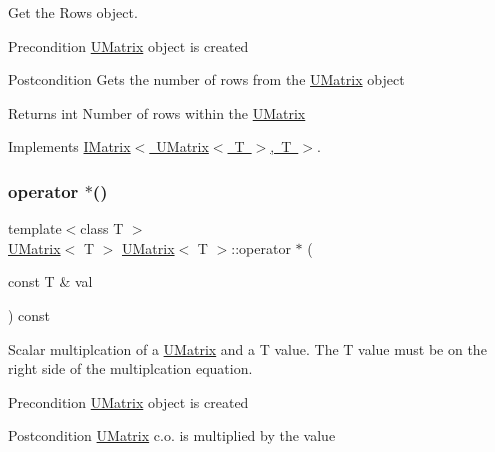 Get the Rows object. 

\begin{DoxyPrecond}{Precondition}
\mbox{\hyperlink{class_u_matrix}{U\+Matrix}} object is created 
\end{DoxyPrecond}
\begin{DoxyPostcond}{Postcondition}
Gets the number of rows from the \mbox{\hyperlink{class_u_matrix}{U\+Matrix}} object 
\end{DoxyPostcond}
\begin{DoxyReturn}{Returns}
int Number of rows within the \mbox{\hyperlink{class_u_matrix}{U\+Matrix}} 
\end{DoxyReturn}


Implements \mbox{\hyperlink{class_i_matrix_a58632b018f4023768db7963e22f468da}{I\+Matrix$<$ U\+Matrix$<$ T $>$, T $>$}}.

\mbox{\label{class_u_matrix_a7b1875cfc49b374875dac2a58948f3ac}} 
\subsubsection{\texorpdfstring{operator $\ast$()}{operator *()}}
{\footnotesize\ttfamily template$<$class T $>$ \\
\mbox{\hyperlink{class_u_matrix}{U\+Matrix}}$<$ T $>$ \mbox{\hyperlink{class_u_matrix}{U\+Matrix}}$<$ T $>$\+::operator $\ast$ (\begin{DoxyParamCaption}\item[{const T \&}]{val }\end{DoxyParamCaption}) const\hspace{0.3cm}{\ttfamily [virtual]}}



Scalar multiplcation of a \mbox{\hyperlink{class_u_matrix}{U\+Matrix}} and a T value. The T value must be on the right side of the multiplcation equation. 

\begin{DoxyPrecond}{Precondition}
\mbox{\hyperlink{class_u_matrix}{U\+Matrix}} object is created 
\end{DoxyPrecond}
\begin{DoxyPostcond}{Postcondition}
\mbox{\hyperlink{class_u_matrix}{U\+Matrix}} c.\+o. is multiplied by the value 
\end{DoxyPostcond}

